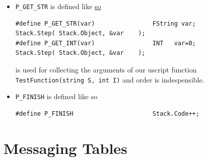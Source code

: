 \documentclass{article}
\theoremstyle{definition}
\begin{document}
\begin{itemize}
\item \texttt{P\_GET\_STR} is defined like \href{https://github.com/ravimohan1991/ChatDiamond/blob/5592fef2b13305e441c1dd2b09dde7dd52ff2d83/UTNativeEssentials/Core/Inc/UnScript.h#L63}{so}
\lstset{language=C++}
\begin{lstlisting}[frame=single]
#define P_GET_STR(var)                FString var;                         Stack.Step( Stack.Object, &var    );
#define P_GET_INT(var)                INT   var=0;                         Stack.Step( Stack.Object, &var    );
\end{lstlisting}
is used for collecting the arguments of our uscript function \texttt{TestFunction(string S, int I)} and order is indespensible.
\item \texttt{P\_FINISH} is defined like so

\lstset{language=C++}
\begin{lstlisting}[frame=single]
#define P_FINISH                      Stack.Code++;
\end{lstlisting}

\end{itemize}

\appendix

\section{Messaging Tables}
\end{document}
